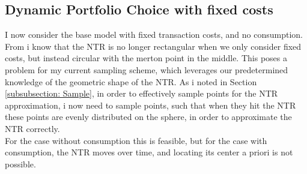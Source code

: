 \documentclass[11pt]{article}
\begin{document}
\subsection{Dynamic Portfolio Choice with fixed costs} \label{Subsection: Results_WithConsumption}
I now consider the base model with fixed transaction costs, and no consumption.
From \autocite{Dybvig2020} i know that the \ac{NTR} is no longer rectangular when we only consider fixed costs, but instead circular with the merton point in the middle.
This poses a problem for my current sampling scheme, which leverages our predetermined knowledge of the geometric shape of the \ac{NTR}.
As i noted in Section \ref{subsubsection: Sample}, in order to effectively sample points for the \ac{NTR} approximation, i now need to 
sample points, such that when they hit the \ac{NTR} these points are evenly distributed on the sphere, in order to approximate the \ac{NTR} correctly.\\
For the case without consumption this is feasible, but for the case with consumption, the \ac{NTR} moves over time, and locating its center a priori is not possible.


\ifdefined\COMPILINGMAIN
\else
\end{document}
